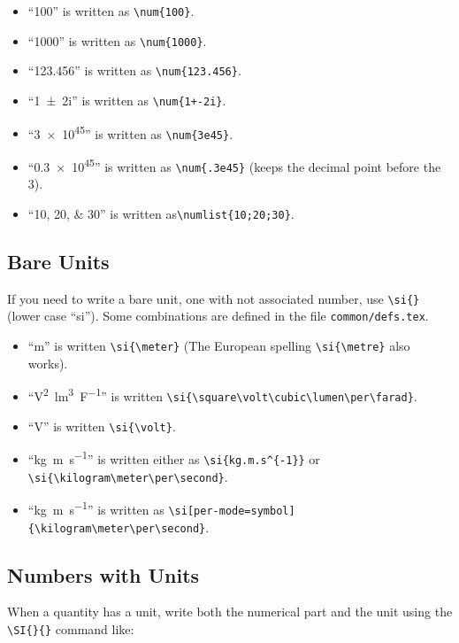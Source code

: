 \begin{itemize}
\item ``\num{100}'' is written as \verb|\num{100}|.
\item ``\num{1000}'' is written as \verb|\num{1000}|.
\item ``\num{123.456}'' is written as \verb|\num{123.456}|.
\item ``\num{1+-2i}'' is written as \verb|\num{1+-2i}|.
\item ``\num{3e45}'' is written as \verb|\num{3e45}|.
\item ``\num{.3e45}'' is written as \verb|\num{.3e45}| (keeps the decimal point before the 3).
\item ``\numlist{10;20;30}'' is written as\verb|\numlist{10;20;30}|.
\end{itemize}

\subsection{Bare Units}

If you need to write a bare unit, one with not associated number, use \verb|\si{}| (lower case ``si''). Some combinations are
defined in the file \texttt{common/defs.tex}.


\begin{itemize}
\item ``\si{\meter}'' is written \verb|\si{\meter}| (The European spelling \verb|\si{\metre}| also works).
\item ``\si{\square\volt\cubic\lumen\per\farad}'' is written \verb|\si{\square\volt\cubic\lumen\per\farad}|.
\item  ``\si{\volt}'' is written \verb|\si{\volt}|.
\item  ``\si{kg.m.s^{-1}}'' is written either as \verb|\si{kg.m.s^{-1}}| or  \verb|\si{\kilogram\meter\per\second}|.
\item  ``\si{kg.m.s^{-1}}'' is written as \verb|\si[per-mode=symbol]{\kilogram\meter\per\second}|. 
\end{itemize}

\subsection{Numbers with Units}

When a quantity has a unit, write both the numerical part and the unit
using the \verb|\SI{}{}| command like:

